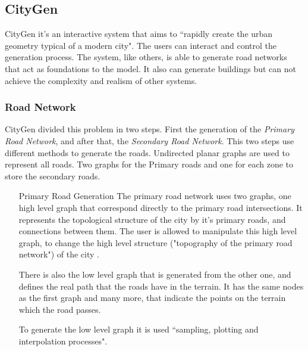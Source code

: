 
\subsection{CityGen } %
\label{sec:citygen}

CityGen \cite{Kelly2008} it's an interactive system that aims  to ``rapidly create the urban geometry typical of a modern city". The users can interact and control the generation process. The system, like others, is able to generate road networks that act as foundations to the model. It also can generate buildings but can not achieve the complexity and realism of other systems.

\subsubsection{Road Network} %
\label{ssub:road_network}

CityGen divided this problem in two steps. First the generation of the \emph{Primary Road Network}, and after that, the \emph{Secondary Road Network}. This two steps use different methods to generate the roads.
Undirected planar graphs are used to represent all roads. Two graphs for the Primary roads and one for each zone to store the secondary roads.

\begin{itemize}
	\item[Primary Road Generation] The primary road network uses two graphs, one high level graph that correspond directly to the primary road intersections. It represents the topological structure of the city by it's primary roads, and connections between them. The user is allowed to manipulate this high level graph, to change the high level structure ("topography of the primary road network") of the city .

There is also the low level graph that is generated from the other one, and defines the real path that the roads have in the terrain. It has the same nodes as the first graph and many more, that indicate the points on the terrain which the road passes.

To generate the low level graph it is used ``sampling, plotting and interpolation processes".
\end{itemize}


